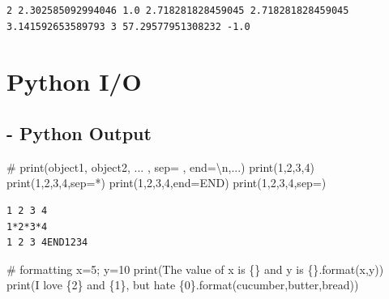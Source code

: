 \documentclass[
  a4paper,
  DIV=11,
  numbers=noendperiod]{scrreprt}
\newenvironment{Shaded}{\begin{snugshade}}{\end{snugshade}}
\newcommand{\BuiltInTok}[1]{\textcolor[rgb]{0.00,0.23,0.31}{#1}}
\newcommand{\CommentTok}[1]{\textcolor[rgb]{0.37,0.37,0.37}{#1}}
\newcommand{\DecValTok}[1]{\textcolor[rgb]{0.68,0.00,0.00}{#1}}
\newcommand{\NormalTok}[1]{\textcolor[rgb]{0.00,0.23,0.31}{#1}}
\newcommand{\OperatorTok}[1]{\textcolor[rgb]{0.37,0.37,0.37}{#1}}
\newcommand{\SpecialCharTok}[1]{\textcolor[rgb]{0.37,0.37,0.37}{#1}}
\newcommand{\StringTok}[1]{\textcolor[rgb]{0.13,0.47,0.30}{#1}}
\begin{document}
\begin{verbatim}
2 2.302585092994046 1.0 2.718281828459045 2.718281828459045 3.141592653589793 3 57.29577951308232 -1.0
\end{verbatim}

\section{Python I/O}\label{python-io}

\subsection{- Python Output}\label{python-output}

\begin{Shaded}
\begin{Highlighting}[]
\CommentTok{\# print(object1, object2, ... , sep=\textquotesingle{} \textquotesingle{}, end=\textquotesingle{}\textbackslash{}n\textquotesingle{},...)}
\BuiltInTok{print}\NormalTok{(}\DecValTok{1}\NormalTok{,}\DecValTok{2}\NormalTok{,}\DecValTok{3}\NormalTok{,}\DecValTok{4}\NormalTok{)}
\BuiltInTok{print}\NormalTok{(}\DecValTok{1}\NormalTok{,}\DecValTok{2}\NormalTok{,}\DecValTok{3}\NormalTok{,}\DecValTok{4}\NormalTok{,sep}\OperatorTok{=}\StringTok{\textquotesingle{}*\textquotesingle{}}\NormalTok{)}
\BuiltInTok{print}\NormalTok{(}\DecValTok{1}\NormalTok{,}\DecValTok{2}\NormalTok{,}\DecValTok{3}\NormalTok{,}\DecValTok{4}\NormalTok{,end}\OperatorTok{=}\StringTok{\textquotesingle{}END\textquotesingle{}}\NormalTok{)}
\BuiltInTok{print}\NormalTok{(}\DecValTok{1}\NormalTok{,}\DecValTok{2}\NormalTok{,}\DecValTok{3}\NormalTok{,}\DecValTok{4}\NormalTok{,sep}\OperatorTok{=}\StringTok{\textquotesingle{}\textquotesingle{}}\NormalTok{)}
\end{Highlighting}
\end{Shaded}

\begin{verbatim}
1 2 3 4
1*2*3*4
1 2 3 4END1234
\end{verbatim}

\begin{Shaded}
\begin{Highlighting}[]
\CommentTok{\# formatting}
\NormalTok{x}\OperatorTok{=}\DecValTok{5}\OperatorTok{;}\NormalTok{ y}\OperatorTok{=}\DecValTok{10}
\BuiltInTok{print}\NormalTok{(}\StringTok{\textquotesingle{}The value of x is }\SpecialCharTok{\{\}}\StringTok{ and y is }\SpecialCharTok{\{\}}\StringTok{\textquotesingle{}}\NormalTok{.}\BuiltInTok{format}\NormalTok{(x,y))}
\BuiltInTok{print}\NormalTok{(}\StringTok{\textquotesingle{}I love }\SpecialCharTok{\{2\}}\StringTok{ and }\SpecialCharTok{\{1\}}\StringTok{, but hate }\SpecialCharTok{\{0\}}\StringTok{\textquotesingle{}}\NormalTok{.}\BuiltInTok{format}\NormalTok{(}\StringTok{\textquotesingle{}cucumber\textquotesingle{}}\NormalTok{,}\StringTok{\textquotesingle{}butter\textquotesingle{}}\NormalTok{,}\StringTok{\textquotesingle{}bread\textquotesingle{}}\NormalTok{))}
\end{Highlighting}
\end{Shaded}
\end{document}
